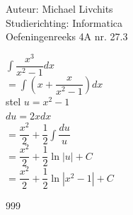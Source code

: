 \documentclass[a4paper]{article}
\begin{document}
  
\noindent \large Auteur: Michael Livchits \\
\noindent \large Studierichting: Informatica\\
\noindent \large Oefeningenreeks 4A nr. 27.3\\

\medskip

\normalsize

$\displaystyle\int\dfrac{x^3}{x^2-1}dx$\\

$= \displaystyle\int\left(x+\dfrac{x}{x^2-1}\right)dx$\\

stel $u = x^2-1$\\

$du = 2xdx$\\

$= \dfrac{x^2}{2}+\dfrac{1}{2}\displaystyle\int\dfrac{du}{u}$\\

$= \dfrac{x^2}{2}+\dfrac{1}{2}\ln |u| + C$\\

$= \dfrac{x^2}{2}+\dfrac{1}{2}\ln |x^2-1| + C$\\


\begin{thebibliography}{999}
\end{thebibliography}
\end{document}
